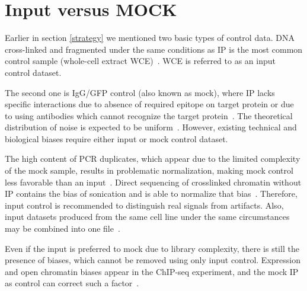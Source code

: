  \section{Input versus MOCK}
 \label{control}

 Earlier in section \ref{strategy} we mentioned two basic types of control data. 
 DNA cross-linked and fragmented under the same conditions as IP is the most common control sample (whole-cell extract WCE)~\cite{kidder2011chip,landt2012chip}. 
 WCE is referred to as an input control dataset. 

 The second one is IgG/GFP control (also known as mock), where IP lacks specific interactions due to absence of required epitope on target protein or due to using antibodies which cannot recognize the target protein~\cite{landt2012chip, shin2013computational}.
 The theoretical distribution of noise is expected to be uniform~\cite{robertson2007genome}. 
 However, existing technical and biological biases require either input or mock control dataset.

 The high content of PCR duplicates, which appear due to the limited complexity of the mock sample, results in problematic normalization, making mock control less favorable than an input~\cite{kidder2011chip}. 
 Direct sequencing of crosslinked chromatin without IP contains the bias of sonication and is able to normalize that bias~\cite{kharchenko2008design}. 
 Therefore, input control is recommended to distinguish real signals from artifacts. 
 Also, input datasets produced from the same cell line under the same circumstances may be combined into one file~\cite{meyer2014identifying}.

 Even if the input is preferred to mock due to library complexity, there is still the presence of biases, which cannot be removed using only input control. 
 Expression and open chromatin biases appear in the ChIP-seq experiment, and the mock IP as control can correct such a factor~\cite{park2013widespread}.


